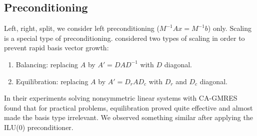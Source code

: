\documentclass{scrartcl}
\newcommand{\norm}[1]{\left\lVert#1\right\rVert}
\begin{document}
\begin{algorithm}[H]
\end{algorithm}

\subsection{Preconditioning}
Left, right, split, we consider left preconditioning ($M^{-1}Ax = M^{-1}b$) only.
Scaling is a special type of preconditioning. \cite{Hoemmen:2010:CKS:1970638} considered two types of scaling in order to prevent rapid basis vector growth:
\begin{enumerate}
\item Balancing: replacing $A$ by $A' = DAD^{-1}$ with $D$ diagonal.
\item Equilibration: replacing $A$ by $A' = D_rAD_c$ with $D_r$ and $D_c$ diagonal.
\end{enumerate}
In their experiments solving nonsymmetric linear systems with CA-GMRES \cite{Hoemmen:2010:CKS:1970638} found that for practical problems, equilibration proved quite effective and almost made the basis type irrelevant. We observed something similar after applying the ILU(0) preconditioner.
\end{document}

